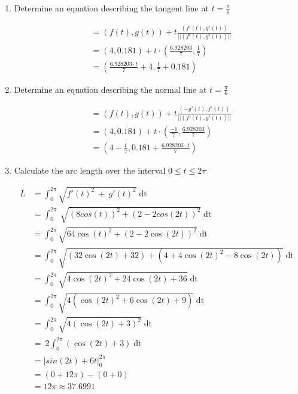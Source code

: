 \documentclass[a4paper,11pt]{article}
\begin{document}
\begin{preview}
\begin{enumerate}
\begin{enumerate}
        \item Determine an equation describing the tangent line at $t = \frac{\pi}{6}$
        
        \begin{align*}
            &= \left( f(t), g(t) \right) + t \frac{(f'(t), g'(t))}{||(f'(t), g'(t))||}\\
            &= (4, 0.181) + t \cdot \left( \frac{6.928203}{7}, \frac{1}{7}\right)\\
            &= \left( \frac{6.928203 \cdot t}{7} + 4, \frac{t}{7} + 0.181 \right)
        \end{align*}

        \item Determine an equation describing the normal line at $t = \frac{\pi}{6}$

        \begin{align*}
            &= \left( f(t), g(t) \right) + t \frac{(-g'(t), f'(t))}{||(f'(t), g'(t))||}\\
            &= (4, 0.181) + t \cdot \left( \frac{-1}{7}, \frac{6.928203}{7}\right)\\
            &= \left( 4 - \frac{t}{7},  0.181 +\frac{6.928203 \cdot t}{7} \right)
        \end{align*}

        \item Calculate the arc length over the interval $0 \leq t \leq 2\pi$
        
        \begin{align*}
            L &= \int_{0}^{2\pi}\sqrt{f'\left(t\right)^{2}\ +\ g'\left(t\right)^{2}}\operatorname{dt}\\
            &= \int _0^{2\pi }\:\sqrt{\left(8cos\left(t\right)\right)^2+\left(2-2cos\left(2t\right)\right)^2} \operatorname{dt}\\
            &= \int_{0}^{2\pi}\sqrt{64\cos\left(t\right)^{2}+\left(2-2\cos\left(2t\right)\right)^{2}}\operatorname{dt}\\
            &= \int_{0}^{2\pi}\sqrt{\left(32\cos\left(2t\right)+32\right)+\left(4+4\cos\left(2t\right)^{2}-8\cos\left(2t\right)\right)}\operatorname{dt}\\
            &=\int_{0}^{2\pi}\sqrt{4\cos\left(2t\right)^{2}+24\cos\left(2t\right)+36}\operatorname{dt}\\
            &=\int_{0}^{2\pi}\sqrt{4\left(\cos\left(2t\right)^{2}+6\cos\left(2t\right)+9\right)}\operatorname{dt}\\
            &= \int_{0}^{2\pi}\sqrt{4\left(\cos\left(2t\right)+3\right)^{2}}\operatorname{dt}\\
            &= \ 2\int_{0}^{2\pi}\left(\cos\left(2t\right)+3\right)\operatorname{dt}\\
            &= \Big| sin(2t) + 6t \Big|^{2\pi}_{0}\\
            &= (0 + 12\pi) - (0 + 0)\\
            &= 12\pi \approx 37.6991\\
        \end{align*}


\end{enumerate}
\end{enumerate}
\end{preview}
\end{document}
